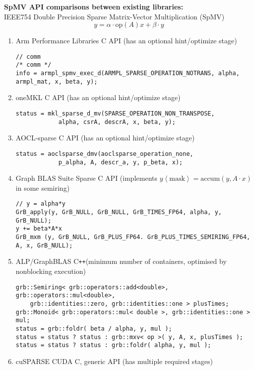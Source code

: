 \documentclass{article}
\newcommand{\cplusplus}{C\texttt{++}\xspace}
\begin{document}
\newpage
\noindent\textbf{SpMV API comparisons between existing libraries:}\\ IEEE754 Double Precision Sparse Matrix-Vector Multiplication (SpMV) \begin{equation*}y = \alpha\cdot\text{op}\left(A\right) x + \beta\cdot y\end{equation*}
\begin{enumerate}[label=(\arabic*)]
\item Arm Performance Libraries C API (has an optional hint/optimize stage)
\begin{lstlisting}
// comm
/* comm */
info = armpl_spmv_exec_d(ARMPL_SPARSE_OPERATION_NOTRANS, alpha, armpl_mat, x, beta, y);
\end{lstlisting}
\item oneMKL C API (has an optional hint/optimize stage)
\begin{lstlisting}
status = mkl_sparse_d_mv(SPARSE_OPERATION_NON_TRANSPOSE,
            alpha, csrA, descrA, x, beta, y);
\end{lstlisting}
\item AOCL-sparse C API (has an optional hint/optimize stage)
\begin{lstlisting}
status = aoclsparse_dmv(aoclsparse_operation_none,
            p_alpha, A, descr_a, y, p_beta, x);
\end{lstlisting}
\item Graph BLAS Suite Sparse C API (implements $y\left<\text{mask}\right> = \text{accum}\left(y, A\cdot x\right)$ in some semiring)
\begin{lstlisting}
// y = alpha*y
GrB_apply(y, GrB_NULL, GrB_NULL, GrB_TIMES_FP64, alpha, y, GrB_NULL);
y += beta*A*x
GrB_mxm (y, GrB_NULL, GrB_PLUS_FP64. GrB_PLUS_TIMES_SEMIRING_FP64, A, x, GrB_NULL);
\end{lstlisting}
\item ALP/GraphBLAS \cplusplus (minimum number of containers, optimised by nonblocking execution)
\begin{lstlisting}
grb::Semiring< grb::operators::add<double>, grb::operators::mul<double>,
    grb::identities::zero, grb::identities::one > plusTimes;
grb::Monoid< grb::operators::mul< double >, grb::identities::one > mul;
status = grb::foldr( beta / alpha, y, mul );
status = status ? status : grb::mxv< op >( y, A, x, plusTimes );
status = status ? status : grb::foldr( alpha, y, mul );
\end{lstlisting}
\item cuSPARSE CUDA C, generic API (has multiple required stages)

\end{enumerate}
\end{document}
